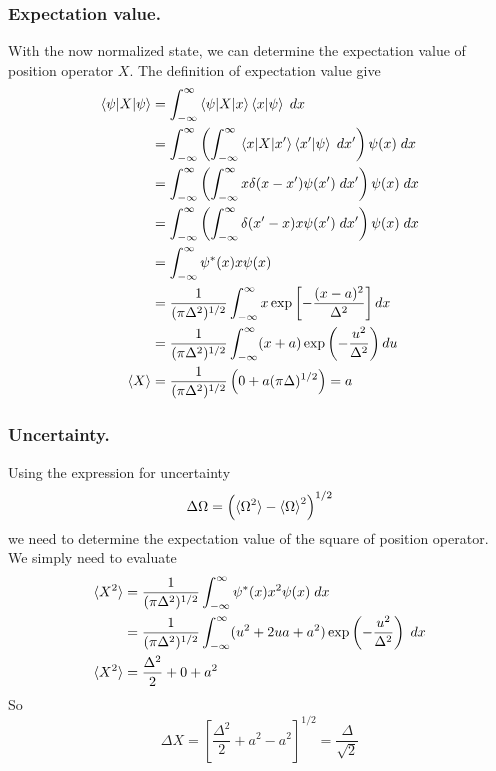 \documentclass[../../../main.tex]{subfiles}
\begin{document}
\subsubsection{Expectation value.}
With the now normalized state, we can determine the expectation  value of position operator $X$.
The definition of expectation value give
\begin{align*}
    \braket{\psi|X|\psi} & = \int_{-\infty}^{\infty} \braket{\psi|X|x}\braket{x|\psi}\;dx                                                   \\
                         & = \int_{-\infty}^{\infty} \left(\int_{-\infty}^{\infty}  \braket{x|X|x'}\braket{x'|\psi}\;dx' \right)\psi(x)\;dx \\
                         & = \int_{-\infty}^{\infty} \left(\int_{-\infty}^{\infty}  x\delta(x-x')\psi(x')\;dx' \right)\psi(x)\;dx           \\
                         & = \int_{-\infty}^{\infty} \left(\int_{-\infty}^{\infty}  \delta(x'-x)x\psi(x')\;dx' \right)\psi(x)\;dx           \\
                         & = \int_{-\infty}^{\infty} \psi ^*(x)x\psi(x)                                                                     \\
                         & = \frac{1 }{(\pi \Delta^2)^{1/2}}\int_{-\infty}^{\infty} x \exp\left[ -\frac{(x-a)^2}{\Delta^2} \right] dx       \\
                         & = \frac{1 }{(\pi\Delta^2)^{1/2}}\int_{-\infty}^{\infty} (x+a)\exp \left( -\frac{u^2 }{\Delta^2} \right) du       \\
    \braket{X}           & =\frac{1 }{(\pi\Delta^2)^{1/2}} \left( 0+a (\pi\Delta)^{1/2} \right) =a
\end{align*}

\subsubsection{Uncertainty.}
Using the expression for uncertainty
\begin{equation*}
    \Delta\Omega=\left( \braket{\Omega^2}-\braket{\Omega}^2 \right) ^{1/2}
\end{equation*}
we need to determine the expectation value of the square of position operator.
We simply need to evaluate
\begin{align*}
    \braket{X^2} & = \frac{1 }{(\pi\Delta^2)^{1/2}} \int_{-\infty}^{\infty} \psi ^*(x)x^2\psi(x)\;dx                                   \\
                 & = \frac{1 }{(\pi\Delta^2)^{1/2}}\int_{-\infty}^{\infty} (u^2+2ua+a^2)\exp \left( -\frac{u ^2}{\Delta^2} \right)\;dx \\
    \braket{X^2} & = \frac{\Delta^2 }{2}+0+a^2
\end{align*}
So
\begin{equation*}
    \Delta X=\left[ \frac{\Delta^2}{2}+a^{2}-a^{2} \right]^{1/2}=\frac{\Delta}{\sqrt{2}}
\end{equation*}
\end{document}
